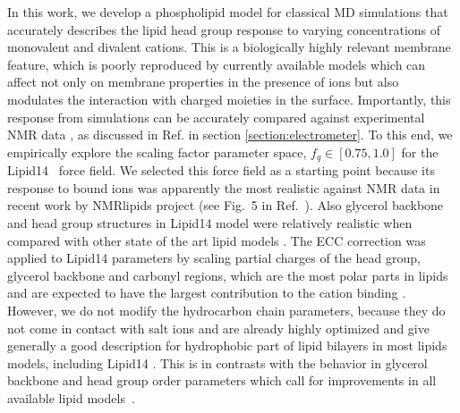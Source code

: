 \documentclass[aip,jcp,twocolumn]{revtex4}
\begin{document}
In this work, we develop a phospholipid model for classical MD simulations that
accurately describes the lipid head group response to varying concentrations
of monovalent and divalent cations. This is a biologically highly relevant membrane feature, which is
poorly reproduced by currently available models which can affect not only on membrane properties
in the presence of ions but also modulates the interaction with charged moieties in the surface.
Importantly, this response from simulations can be accurately
compared against experimental NMR data \cite{akutsu81,altenbach84,scherer89},
as discussed in Ref.  in section \ref{section:electrometer}.
To this end, we empirically explore the scaling factor parameter space, $f_q \in [0.75, 1.0]$ for the Lipid14~\cite{dickson14} force field.
We selected this force field as a starting point because its response to bound ions was apparently the most realistic against NMR data
in recent work by NMRlipids project (see Fig.~5 in Ref.~).
Also glycerol backbone and head group structures in Lipid14 model were
relatively realistic when compared with other state of the art lipid models \cite{botan15}.
The ECC correction was applied to Lipid14 parameters by scaling partial charges of the head group,
glycerol backbone and carbonyl regions, which are the most polar parts in lipids and
are expected to have the largest contribution to the cation binding
.
However, we do not modify the hydrocarbon chain parameters, because they
do not come in contact with salt ions and are
already highly optimized and give generally a good description for
hydrophobic part of lipid bilayers in most lipids models, including Lipid14 \cite{ollila16}.
This is in contrasts with the behavior in glycerol backbone and head group order
parameters which call for improvements in all available lipid models~\cite{botan15}. 
\end{document}
